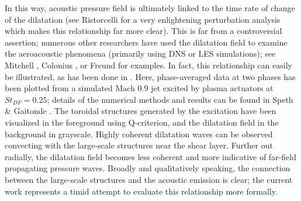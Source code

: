 In this way, acoustic pressure field is ultimately linked to the time rate of change of the dilatation (see Ristorcelli \citep{Ristorcelli1997} for a very enlightening perturbation analysis which makes this relationship far more clear).
This is far from a controversial assertion; numerous other researchers have used the dilatation field to examine the aeroacoustic phenomena (primarily using DNS or LES simulations); see Mitchell \etal [cite 1995], Colonius \etal [cite 1997], or Freund \etal [cite 2000] for examples.
In fact, this relationship can easily be illustrated, as has been done in . 
Here, phase-averaged data at two phases has been plotted from a simulated Mach 0.9 jet excited by plasma actuators at $St_{DF} = 0.25$; details of the numerical methods and results can be found in Speth \& Gaitonde \citep{Speth2014}. 
The toroidal structures generated by the excitation have been visualized in the foreground using Q-criterion, and the dilatation field in the background in grayscale.
Highly coherent dilatation waves can be observed convecting with the large-scale structures near the shear layer. 
Further out radially, the dilatation field becomes less coherent and more indicative of far-field propagating pressure waves.
Broadly and qualitatively speaking, the connection between the large-scale structures and the acoustic emission is clear; the current work represents a timid attempt to evaluate this relationship more formally.
